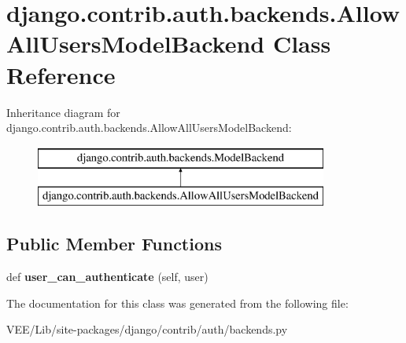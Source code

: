 \hypertarget{classdjango_1_1contrib_1_1auth_1_1backends_1_1_allow_all_users_model_backend}{}\section{django.\+contrib.\+auth.\+backends.\+Allow\+All\+Users\+Model\+Backend Class Reference}
\label{classdjango_1_1contrib_1_1auth_1_1backends_1_1_allow_all_users_model_backend}
Inheritance diagram for django.\+contrib.\+auth.\+backends.\+Allow\+All\+Users\+Model\+Backend\+:\begin{figure}[H]
\begin{center}
\leavevmode
\includegraphics[height=2.000000cm]{classdjango_1_1contrib_1_1auth_1_1backends_1_1_allow_all_users_model_backend}
\end{center}
\end{figure}
\subsection*{Public Member Functions}
\begin{DoxyCompactItemize}
\item 
\mbox{\label{classdjango_1_1contrib_1_1auth_1_1backends_1_1_allow_all_users_model_backend_ae1d29b5e077951b8f034a65c0bc6a005}} 
def {\bfseries user\+\_\+can\+\_\+authenticate} (self, user)
\end{DoxyCompactItemize}


The documentation for this class was generated from the following file\+:\begin{DoxyCompactItemize}
\item 
V\+E\+E/\+Lib/site-\/packages/django/contrib/auth/backends.\+py\end{DoxyCompactItemize}
